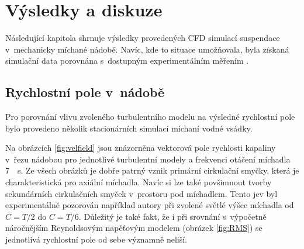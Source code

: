 \chapter{Výsledky a diskuze}
Následující kapitola shrnuje výsledky provedených CFD simulací suspendace v~mechanicky míchané nádobě. Navíc, kde to situace umožňovala, byla získaná simulační data porovnána s~dostupným experimentálním měřením \citep{pav11}.

\section{Rychlostní pole v~nádobě}
Pro porovnání vlivu zvoleného turbulentního modelu na výsledné rychlostní pole bylo provedeno několik stacionárních simulací míchaní vodné vsádky. 

Na obrázcích \ref{fig:velfield} jsou znázorněna vektorová pole rychlosti kapaliny v~řezu nádobou pro jednotlivé turbulentní modely a frekvenci otáčení míchadla \SI{7}{\per\second}. Ze všech obrázků je dobře patrný vznik primární cirkulační smyčky, která je charakteristická pro axiální míchadla. Navíc si lze také povšimnout tvorby sekundárních cirkulačních smyček v~prostoru pod míchadlem. Tento jev byl experimentálně pozorován například autory \citet{hos10} při zvolené světlé výšce míchadla od $C=T/2$ do $C=T/6$. Důležitý je také fakt, že i při srovnání s~výpočetně náročnějším Reynoldsovým napěťovým modelem (obrázek \ref{fig:RMS}) se jednotlivá rychlostní pole od sebe významně neliší.

